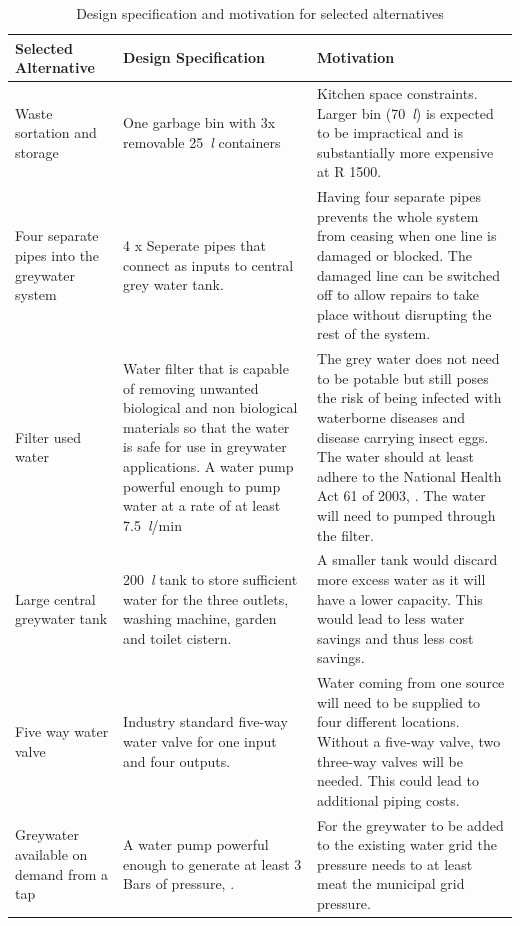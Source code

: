 \documentclass[a4paper,11pt,fleqn]{report}
\begin{document}
\begin{table}[h!]
\caption {Design specification and motivation for selected alternatives} \label{tb: Functional_design_specs} 
\begin{center}
\begin{tabular}{p{4.5cm}|p{4.5cm}|p{4.5cm}}\toprule
	{\textbf{Selected Alternative}} & {\textbf{Design Specification}} & {\textbf{Motivation}}\\ \midrule
    \hline
    Waste sortation and storage & One garbage bin with 3x removable 25~\textit{l} containers & 
Kitchen space constraints. Larger bin (70~\textit{l}) is expected to be impractical and is substantially more expensive at R 1500.\\
        \hline
    Four separate pipes into the greywater system & 4 x Seperate pipes that connect as inputs to central grey water tank. & Having four separate pipes prevents the whole system from ceasing when one line is damaged or blocked. The damaged line can be switched off to allow repairs to take place without disrupting the rest of the system.\\
        \hline
    Filter used water & Water filter that is capable of removing unwanted biological and non biological materials so that the water is safe for use in greywater applications.
A water pump powerful enough to pump water at a rate of at least 7.5~\textit{l}/min
 & The grey water does not need to be potable but still poses the risk of being infected with waterborne diseases and disease carrying insect eggs. The water should at least adhere to the National Health Act 61 of 2003, \citep{NHA2003}.
The water will need to pumped through the filter.\\
        \hline
    Large central greywater tank & 200~\textit{l} tank to store sufficient water for the three outlets, washing machine, garden and toilet cistern. & A smaller tank would discard more excess water as it will have a lower capacity. This would lead to less water savings and thus less cost savings.\\
        \hline
    Five way water valve & Industry standard five-way water valve for one input and four outputs. & Water coming from one source will need to be supplied to four different locations. Without a five-way valve, two three-way valves will be needed. This could lead to additional piping costs.\\
            \hline
    Greywater available on demand from a tap & A water pump powerful enough to generate at least 3 Bars of pressure, \citep{Bran2016}. & For the greywater to be added to the existing water grid the pressure needs to at least meat the municipal grid pressure.\\

\end{tabular}
\end{center}
\end{table}
\end{document}
